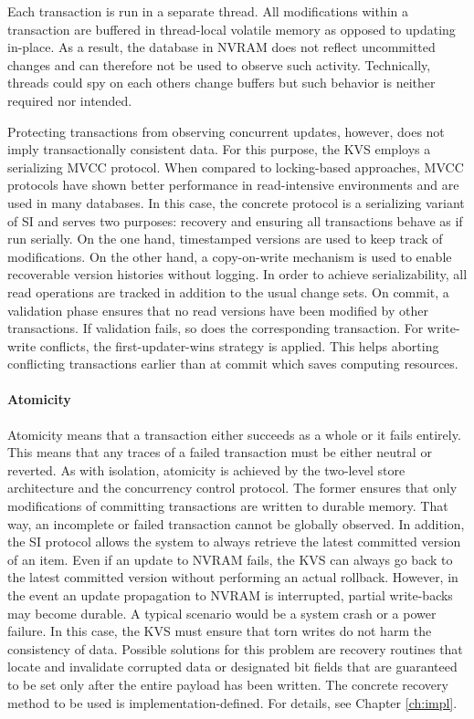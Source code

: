 Each transaction is run in a separate thread. All modifications within a
transaction are buffered in thread-local volatile memory as opposed to updating
in-place. As a result, the database in \ac{NVRAM} does not reflect uncommitted
changes and can therefore not be used to observe such activity. Technically,
threads could spy on each others change buffers but such behavior is neither
required nor intended.

Protecting transactions from observing concurrent updates, however, does not
imply transactionally consistent data. For this purpose, the \ac{KVS} employs a
serializing \ac{MVCC} protocol. When compared to locking-based approaches,
\ac{MVCC} protocols have shown better performance in read-intensive environments
and are used in many databases. In this case, the concrete protocol is a
serializing variant of \ac{SI} and serves two purposes: recovery and ensuring
all transactions behave as if run serially. On the one hand, timestamped
versions are used to keep track of modifications. On the other hand, a
copy-on-write mechanism is used to enable recoverable version histories without
logging. In order to achieve serializability, all read operations are tracked in addition to the usual change sets. On commit, a validation phase ensures that no read versions have been modified by other transactions. If validation fails, so does the corresponding transaction. For write-write conflicts, the first-updater-wins strategy is applied. This helps aborting conflicting transactions earlier than at commit which saves computing resources.

\paragraph{Atomicity}

Atomicity means that a transaction either succeeds as a whole or it fails
entirely. This means that any traces of a failed transaction must be either
neutral or reverted. As with isolation, atomicity is achieved by the two-level
store architecture and the concurrency control protocol. The former ensures that
only modifications of committing transactions are written to durable memory.
That way, an incomplete or failed transaction cannot be globally observed. In
addition, the \ac{SI} protocol allows the system to always retrieve the latest
committed version of an item. Even if an update to \ac{NVRAM} fails, the
\ac{KVS} can always go back to the latest committed version without performing
an actual rollback. However, in the event an update propagation to \ac{NVRAM} is
interrupted, partial write-backs may become durable. A typical scenario would be
a system crash or a power failure. In this case, the \ac{KVS} must ensure that
torn writes do not harm the consistency of data. Possible solutions for this
problem are recovery routines that locate and invalidate corrupted data or
designated bit fields that are guaranteed to be set only after the entire payload
has been written. The concrete recovery method to be used is
implementation-defined. For details, see Chapter \ref{ch:impl}.

